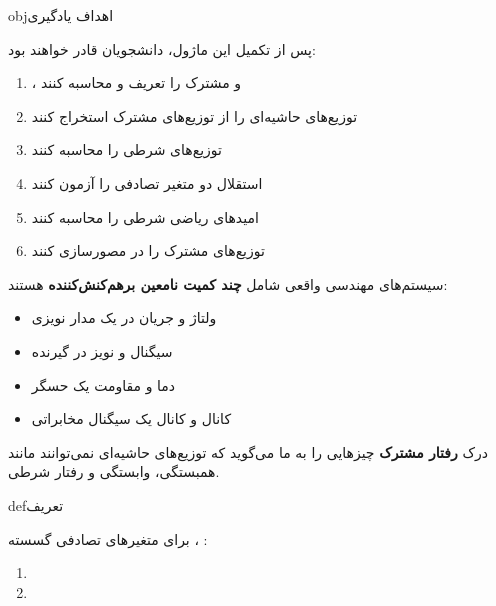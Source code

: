 \begin{PSbox}[unbreakable]{obj}{اهداف یادگیری}

پس از تکمیل این ماژول، دانشجویان قادر خواهند بود:

\begin{enumerate}
\def\labelenumi{\arabic{enumi}.}
\tightlist
\item
  ،  و  مشترک را تعریف و محاسبه کنند
\item
  توزیع‌های حاشیه‌ای را از توزیع‌های مشترک استخراج کنند
\item
  توزیع‌های شرطی را محاسبه کنند
\item
  استقلال دو متغیر تصادفی را آزمون کنند
\item
  امیدهای ریاضی شرطی را محاسبه کنند
\item
  توزیع‌های مشترک را در  مصورسازی کنند
\end{enumerate}

\end{PSbox}


سیستم‌های مهندسی واقعی شامل \textbf{چند کمیت نامعین برهم‌کنش‌کننده} هستند:

\begin{itemize}
\tightlist
\item
  ولتاژ و جریان در یک مدار نویزی
\item
  سیگنال و نویز در گیرنده
\item
  دما و مقاومت یک حسگر
\item
  کانال  و کانال  یک سیگنال مخابراتی
\end{itemize}

درک \textbf{رفتار مشترک} چیزهایی را به ما می‌گوید که توزیع‌های حاشیه‌ای نمی‌توانند  مانند همبستگی، وابستگی و رفتار شرطی.


\begin{PSbox}[unbreakable]{def}{تعریف}

برای متغیرهای تصادفی گسسته ، :

\end{PSbox}


\begin{enumerate}
\def\labelenumi{\arabic{enumi}.}
\tightlist
\item
\item
\end{enumerate}

